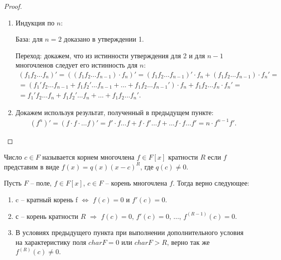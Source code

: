 \begin{proof}
    \begin{enumerate}
        \item Индукция по $n$:

        База: для $n = 2$ доказано в утверждении 1.

        Переход: докажем, что из истинности утверждения для 2 и для $n-1$ многочленов следует его 
        истинность для $n$:
        \begin{align*}
            (f_1 f_2 \dots f_n)' = ((f_1 f_2 \dots f_{n-1}) \cdot f_n)' = (f_1 f_2 \dots f_{n-1})' 
            \cdot f_n + (f_1 f_2 \dots f_{n-1}) \cdot f_n' = \\ =
            (f_1' f_2 \dots f_{n-1} + f_1 f_2' \dots f_{n-1} + \dots + f_1 f_2 \dots f_{n-1}') 
            \cdot f_n + f_1 f_2 \dots f_n \cdot f_n' = \\ = f_1' f_2 \dots f_n + f_1 f_2' \dots f_n 
            + \dots + f_1 f_2 \dots f_n'.
        \end{align*}

        \item Докажем используя результат, полученный в предыдущем пункте:
        \begin{align*}
            (f^n)' = (f \cdot f \cdot \dots f)' = f' \cdot f \dots f + f \cdot f' \dots f 
            + \dots f \cdot f \dots f' = n \cdot f^{n-1} f'.
        \end{align*}
    \end{enumerate}
\end{proof}

\begin{definition}
    Число $c \in F$ называется корнем многочлена $f \in F[x]$ кратности 
    $R$ если $f$ представим в виде $f(x) = q(x) (x-c)^R$, где $q(c) \neq 0$.
\end{definition}

\begin{theorem}
    Пусть $F$ -- поле, $f \in F[x]$, $c \in F$ -- корень многочлена $f$. Тогда верно следующее:
    \begin{enumerate}
        \item c -- кратный корень f $\Leftrightarrow$ $f(c) = 0$ и $f'(c) = 0$.
        \item с -- корень кратности $R$ $\Rightarrow$ $f(c) = 0$, $f'(c) = 0$, $\dots$, 
            $f^{(R-1)}(c) = 0$.
        \item В условиях предыдущего пункта при выполнении дополнительного условия на характеристику
            поля $char F = 0$ или $char F > R$, верно так же $f^{(R)}(c) \neq 0$.
    \end{enumerate}
\end{theorem}

